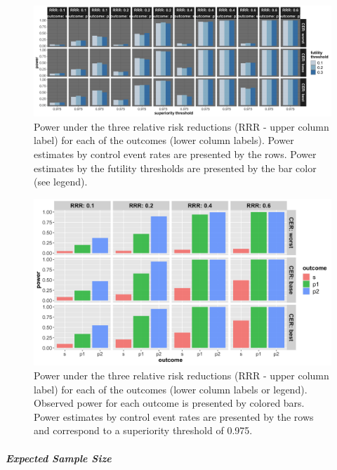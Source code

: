 \documentclass[]{article}
\let\oldsubparagraph\subparagraph
\renewcommand{\subparagraph}[1]{\oldsubparagraph{#1}\mbox{}}
\begin{document}
\begin{figure}
  \caption{Power under the three relative risk reductions (RRR - upper column label) for each of the outcomes (lower column labels). 
  Power estimates by control event rates are presented by the rows. Power estimates by the futility thresholds are presented by the bar color (see legend).}
  \includegraphics{../p1_plots/batch_size_nb_3000/power_all_p1.png}
\end{figure}

\begin{figure}
  \caption{Power under the three relative risk reductions (RRR - upper column label) for each of the outcomes (lower
  column labels or legend). Observed power for each outcome is presented by colored bars. Power estimates by control
  event rates are presented by the rows and correspond to a superiority threshold of 0.975.}
  \includegraphics{../p1_plots/batch_size_nb_3000/power_p1.png}
\end{figure}

\hypertarget{expected-sample-size-2}{%
\subparagraph{Expected Sample Size}\label{expected-sample-size-2}}
\end{document}
